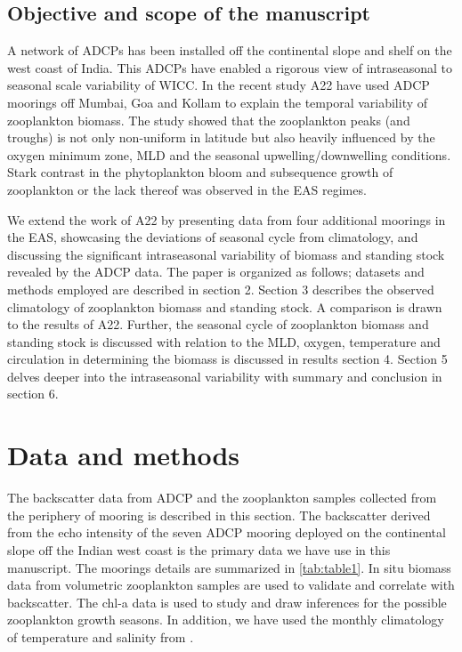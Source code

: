 \documentclass{article}
\begin{document}
	\subsection{Objective and scope of the manuscript}
	
	A network of ADCPs has been installed off the continental slope and shelf on the west coast of India. This ADCPs have enabled a rigorous view of intraseasonal to seasonal scale variability \citep{amol2014observed, chaudhuri2020observed} of WICC. In the recent study A22 have used ADCP moorings off  Mumbai, Goa and Kollam to explain the temporal variability of zooplankton biomass. The study showed that the zooplankton peaks (and troughs) is not only non-uniform in latitude but also heavily influenced by the oxygen minimum zone, MLD and the seasonal upwelling/downwelling conditions. Stark contrast in the phytoplankton bloom and subsequence  growth of zooplankton or the lack thereof was observed in the EAS regimes.
	
    We extend the work of A22 by presenting data from four additional moorings in the EAS, showcasing the deviations of seasonal cycle from climatology, and discussing the significant intraseasonal variability of biomass and standing stock revealed by the ADCP data. The paper is organized as follows; datasets and methods employed are described in section 2. Section 3 describes the observed climatology of zooplankton biomass and standing stock. A comparison is drawn to the results of A22. Further, the seasonal cycle of zooplankton biomass and standing stock is discussed with relation to the MLD, oxygen, temperature and circulation in determining the biomass is discussed in results section 4. Section 5 delves deeper into the intraseasonal variability with summary and conclusion in section 6.
	
	\section{Data and methods}
	The  backscatter data from ADCP and the zooplankton samples collected from the periphery of mooring is described in this section. The backscatter derived from the echo intensity of the seven ADCP mooring deployed on the continental slope off the Indian west coast is the primary data we have use in this manuscript. The moorings details are summarized in \autoref{tab:table1}. In situ biomass data from volumetric zooplankton samples are used to validate and correlate with backscatter. The chl-a data is used to study and draw inferences for the possible zooplankton growth seasons. In addition, we have used the monthly climatology of temperature and salinity from \citet{chatterjee2012new}. 
	
\end{document}
